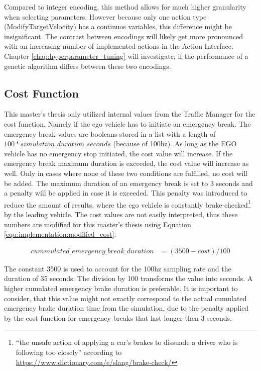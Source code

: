 Compared to integer encoding, this method allows for much higher granularity when selecting parameters. However because only one action type (ModifyTargetVelocity) has a continuos variables, this difference might be insignificant. The contrast between encodings will likely get more pronounced with an increasing number of implemented actions in the Action Interface. Chapter \ref{chap:hyperparameter_tuning} will investigate, if the performance of a genetic algorithm differs between these two encodings.

\subsection{Cost Function}
\label{sect:implementation:cost_function}
This master's thesis only utilized internal values from the Traffic Manager for the cost function. Namely if the ego vehicle has to initiate an emergency break. The emergency break values are booleans stored in a list with a length of $100 * simulation\_duration\_seconds$ (because of 100hz). As long as the EGO vehicle has no emergency stop initiated, the cost value will increase. If the emergency break maximum duration is exceeded, the cost value will increase as well. Only in cases where none of these two conditions are fulfilled, no cost will be added.
The maximum duration of an emergency break is set to 3 seconds and a penalty will be applied in case it is exceeded. This penalty was introduced to reduce the amount of results, where the ego vehicle is constantly brake-checked\footnote{\enquote{the unsafe action of applying a car’s brakes to dissuade a driver who is following too closely} according to \href{https://www.dictionary.com/e/slang/brake-check/}{https://www.dictionary.com/e/slang/brake-check/}} by the leading vehicle. The cost values are not easily interpreted, thus these numbers are modified for this master's thesis using Equation \ref{equ:implementation:modified_cost}.

\begin{equation} 
	\begin{split}
		cummulated\_emergency\_break\_duration & = (3500 - cost) / 100
	\end{split}
	\label{equ:implementation:modified_cost}
\end{equation}

The constant 3500 is used to account for the 100hz sampling rate and the duration of 35 seconds. The division by 100 transforms the value into seconds. A higher cumulated emergency brake duration is preferable. It is important to consider, that this value might not exactly correspond to the actual cumulated emergency brake duration time from the simulation, due to the penalty applied by the cost function for emergency breaks that last longer then 3 seconds.

